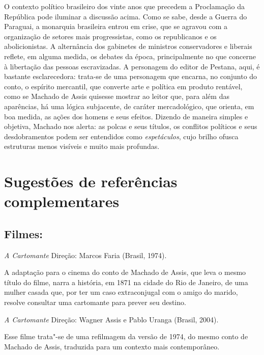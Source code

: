 \documentclass[11pt]{extarticle}
\begin{document}
O contexto político brasileiro dos vinte anos que precedem a Proclamação
da República pode iluminar a discussão acima. Como se sabe, desde a
Guerra do Paraguai, a monarquia brasileira entrou em crise, que se
agravou com a organização de setores mais progressistas, como os
republicanos e os abolicionistas. A alternância dos gabinetes de
ministros conservadores e liberais reflete, em alguma medida, os debates
da época, principalmente no que concerne à libertação das pessoas
escravizadas. A personagem do editor de Pestana, aqui, é bastante
esclarecedora: trata-se de uma personagem que encarna, no conjunto do
conto, o espírito mercantil, que converte arte e política em produto
rentável, como se Machado de Assis quisesse mostrar ao leitor que, para
além das aparências, há uma lógica subjacente, de caráter mercadológico,
que orienta, em boa medida, as ações dos homens e seus efeitos. Dizendo
de maneira simples e objetiva, Machado nos alerta: as polcas e seus
títulos, os conflitos políticos e seus desdobramentos podem ser
entendidos como \emph{espetáculos}, cujo brilho ofusca estruturas menos
visíveis e muito mais profundas.


\section{Sugestões de referências complementares}\label{sugestoes}

\subsection{Filmes:}

\textit{A Cartomante} Direção: Marcos Faria (Brasil, 1974).

A adaptação para o cinema do conto de Machado de Assis, que leva o mesmo título 
do filme, narra a história, em 1871 na cidade do Rio de Janeiro, de uma mulher casada que, 
por ter um caso extraconjugal com o amigo do marido, resolve consultar uma cartomante para 
prever seu destino.

\textit{A Cartomante} Direção: Wagner Assis e Pablo Uranga (Brasil, 2004).

Esse filme trata"-se de uma refilmagem da versão de 1974, do mesmo conto 
de Machado de Assis, traduzida para um contexto mais contemporâneo.
\end{document}
